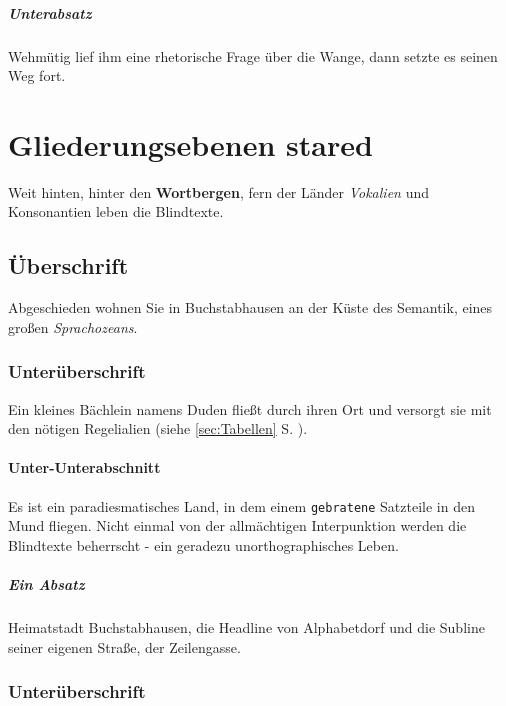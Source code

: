 \documentclass[%
	12pt,%
	a4paper,%
	oneside,%
	listof=totoc,
 	index=totoc,
	bibliography = totoc,
	parskip = half,%
	chapterprefix=false,%
	appendixprefix, %
headings=small,%
]{scrreprt}
\begin{document}
\paragraph{Unterabsatz}
Wehmütig lief ihm eine rhetorische Frage über die Wange, dann setzte es seinen Weg fort.
\chapter*{Gliederungsebenen stared}
\label{sec:Gliederung3}

Weit hinten, hinter den \textbf{Wortbergen}, fern der Länder \textit{Vokalien} und Konsonantien leben die Blindtexte.

\section*{Überschrift}

Abgeschieden wohnen Sie in Buchstabhausen an der Küste des Semantik, eines großen \textsl{Sprachozeans}. 

\subsection*{Unterüberschrift}

Ein kleines Bächlein namens Duden fließt durch ihren Ort und versorgt sie mit den nötigen Regelialien (siehe \ref{sec:Tabellen} S. \pageref{sec:Tabellen}).

\subsubsection*{Unter-Unterabschnitt}

Es ist ein paradiesmatisches Land, in dem einem \texttt{gebratene} Satzteile in den Mund fliegen. Nicht einmal von der allmächtigen Interpunktion werden die Blindtexte beherrscht - ein geradezu unorthographisches Leben. 

\paragraph*{Ein Absatz}
Heimatstadt Buchstabhausen, die Headline von Alphabetdorf und die Subline seiner eigenen Straße, der Zeilengasse.

\subsection*{Unterüberschrift}
\end{document}
